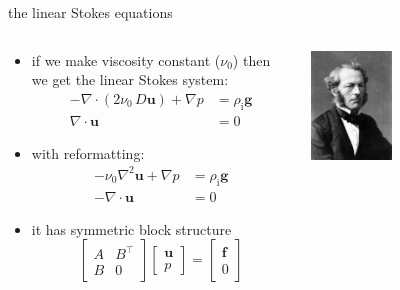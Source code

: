 \documentclass[10pt,hyperref,dvipsnames]{beamer}
\newcommand{\bbf}{\mathbf{f}}
\newcommand{\bu}{\mathbf{u}}
\newcommand{\Div}{\nabla\cdot}
\newcommand{\rhoi}{\rho_{\text{i}}}
\begin{document}
\begin{frame}{the linear Stokes equations}

\begin{columns}

\begin{column}{0.6\textwidth}
\begin{itemize}
\item if we make viscosity constant ($\nu_0$) then we get the linear Stokes system:
\begin{align*}
- \nabla \cdot \left(2 \nu_0\, D\bu\right) + \nabla p &= \rhoi \mathbf{g}  \\
\Div \bu &= 0
\end{align*}
\item with reformatting:
\begin{align*}
- \nu_0 \nabla^2 \bu + \nabla p &= \rhoi \mathbf{g}  \\
-\Div \bu \qquad \,\,\,\, &= 0
\end{align*}
\item it has symmetric block structure
  $$\begin{bmatrix} A & B^\top \\ B & 0 \end{bmatrix} \begin{bmatrix} \bu \\ p  \end{bmatrix} = \begin{bmatrix} \bbf \\ 0 \end{bmatrix}$$
\end{itemize}
\end{column}

\begin{column}{0.4\textwidth}
\hfill \includegraphics[width=0.4\textwidth]{figs/people/gstokes.jpg}


\end{column}
\end{columns}
\end{frame}
\end{document}
